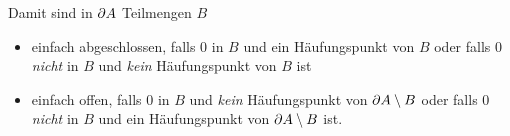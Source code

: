 %    
    Damit sind in $\partial A$ Teilmengen $B$
    \begin{itemize}
        \item einfach abgeschlossen, falls $0$ in $B$ und ein Häufungspunkt von $B$ oder falls $0$ \textit{nicht} in $B$ und \textit{kein} Häufungspunkt von $B$ ist
        \item einfach offen, falls $0$ in $B$ und \textit{kein} Häufungspunkt von $\partial A \setminus B$ oder falls $0$ \textit{nicht} in $B$ und ein Häufungspunkt von $\partial A \setminus B$ ist.
    \end{itemize}
